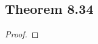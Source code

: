 \documentclass[../../main.tex]{subfiles}
\begin{document}
\subsection{Theorem 8.34}
\begin{wts}

\end{wts}
\begin{proof}

\end{proof}
\end{document}
